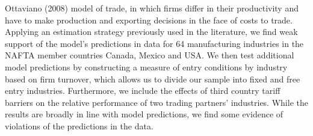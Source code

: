 Ottaviano (2008) model of trade, in which firms differ in their 
productivity and have to make production and exporting decisions in the face of 
costs to trade. Applying an estimation strategy previously used in the literature,
we find weak support of the model's predictions in data for 64 manufacturing industries
in the NAFTA member countries Canada, Mexico and USA. We then test additional 
model predictions by constructing a measure of entry conditions by industry based
on firm turnover, which allows us to divide our sample into fixed and free entry
industries. Furthermore, we include the effects of third country tariff barriers
on the relative performance of two trading partners' industries. While the results
are broadly in line with model predictions, we find some evidence of violations
of the predictions in the data.